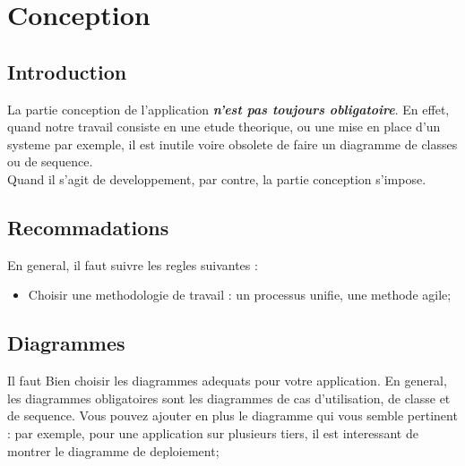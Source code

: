 
\setcounter{chapter}{1}
\chapter{Conception}
\minitoc %
\graphicspath{{Chapitre2/figures/}}


\pagestyle{fancy}
\fancyhf{}
\fancyhead[R]{\bfseries\rightmark}
\fancyfoot[R]{\thepage}
\renewcommand{\headrulewidth}{0.5pt}
\renewcommand{\footrulewidth}{0pt}
\renewcommand{\chaptermark}[1]{\markboth{\MakeUppercase{\chaptername~\thechapter. #1 }}{}}
\renewcommand{\sectionmark}[1]{\markright{\thechapter.\thesection~ #1}}

\begin{spacing}{1.2}
\section*{Introduction}
La partie conception de l'application \textbf{\textsl{n'est pas toujours obligatoire}}. En effet, quand notre travail consiste en une etude theorique, ou une mise en place d'un systeme par exemple,
il est inutile voire obsolete de faire un diagramme de classes ou de sequence.\\
Quand il s'agit de developpement, par contre, la partie conception s'impose.
\section{Recommadations}
En general,
il faut suivre les regles suivantes :
\begin{itemize}
	\item Choisir une methodologie de travail : un processus unifie, une methode agile;
\end{itemize}
\section{Diagrammes}
Il faut Bien choisir les diagrammes adequats pour votre application. En general, les
diagrammes obligatoires sont les diagrammes de cas d'utilisation, de classe et de
sequence. Vous pouvez ajouter en plus le diagramme qui vous semble pertinent :
par exemple, pour une application sur plusieurs tiers, il est interessant de
montrer le diagramme de deploiement;
\begin{itemize}


\end{itemize}
\end{spacing}
